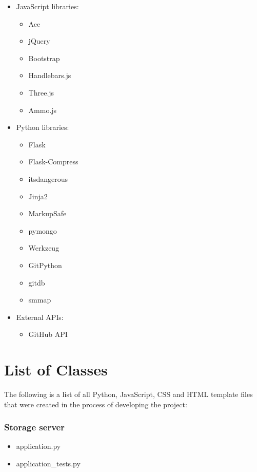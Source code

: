 \begin{itemize}
	\itemsep-0.6em
	\item JavaScript libraries:
	\begin{itemize}
		\itemsep-0.6em
		\item Ace
		\item jQuery
		\item Bootstrap
		\item Handlebars.js
		\item Three.js
		\item Ammo.js
	\end{itemize}
	
	\item Python libraries:
	\begin{itemize}
		\itemsep-0.6em
		\item Flask
		\item Flask-Compress
		\item itsdangerous
		\item Jinja2
		\item MarkupSafe
		\item pymongo
		\item Werkzeug
		\item GitPython
		\item gitdb
		\item smmap
	\end{itemize}

	\item External APIs:
	\begin{itemize}
		\itemsep-0.6em
		\item GitHub API
	\end{itemize}
\end{itemize}


\section{List of Classes}
The following is a list of all Python, JavaScript, CSS and HTML template files that were created in the process of developing the project:

\subsubsection{Storage server}
\begin{itemize}
	\itemsep-0.6em
	\item application.py
	\item application\_tests.py
\end{itemize}
